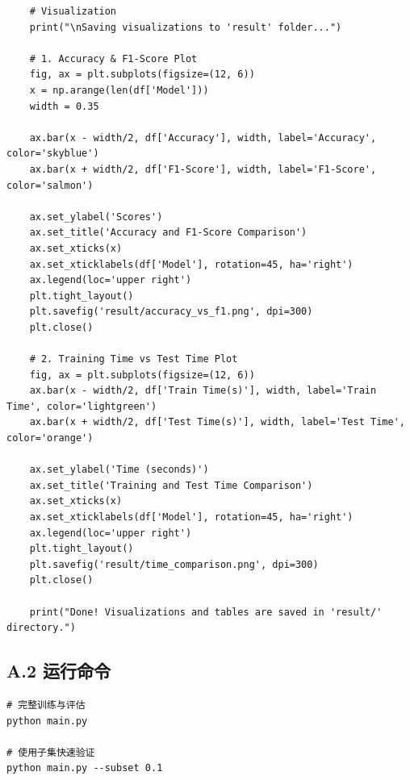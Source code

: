 \documentclass[runningheads]{ctexart}
\begin{document}
\begin{lstlisting}
    # Visualization
    print("\nSaving visualizations to 'result' folder...")
    
    # 1. Accuracy & F1-Score Plot
    fig, ax = plt.subplots(figsize=(12, 6))
    x = np.arange(len(df['Model']))
    width = 0.35
    
    ax.bar(x - width/2, df['Accuracy'], width, label='Accuracy', color='skyblue')
    ax.bar(x + width/2, df['F1-Score'], width, label='F1-Score', color='salmon')
    
    ax.set_ylabel('Scores')
    ax.set_title('Accuracy and F1-Score Comparison')
    ax.set_xticks(x)
    ax.set_xticklabels(df['Model'], rotation=45, ha='right')
    ax.legend(loc='upper right')
    plt.tight_layout()
    plt.savefig('result/accuracy_vs_f1.png', dpi=300)
    plt.close()
    
    # 2. Training Time vs Test Time Plot
    fig, ax = plt.subplots(figsize=(12, 6))
    ax.bar(x - width/2, df['Train Time(s)'], width, label='Train Time', color='lightgreen')
    ax.bar(x + width/2, df['Test Time(s)'], width, label='Test Time', color='orange')
    
    ax.set_ylabel('Time (seconds)')
    ax.set_title('Training and Test Time Comparison')
    ax.set_xticks(x)
    ax.set_xticklabels(df['Model'], rotation=45, ha='right')
    ax.legend(loc='upper right')
    plt.tight_layout()
    plt.savefig('result/time_comparison.png', dpi=300)
    plt.close()

    print("Done! Visualizations and tables are saved in 'result/' directory.")
\end{lstlisting}

\subsection*{A.2 运行命令}

\begin{verbatim}
# 完整训练与评估
python main.py

# 使用子集快速验证
python main.py --subset 0.1
\end{verbatim}
\end{document}
